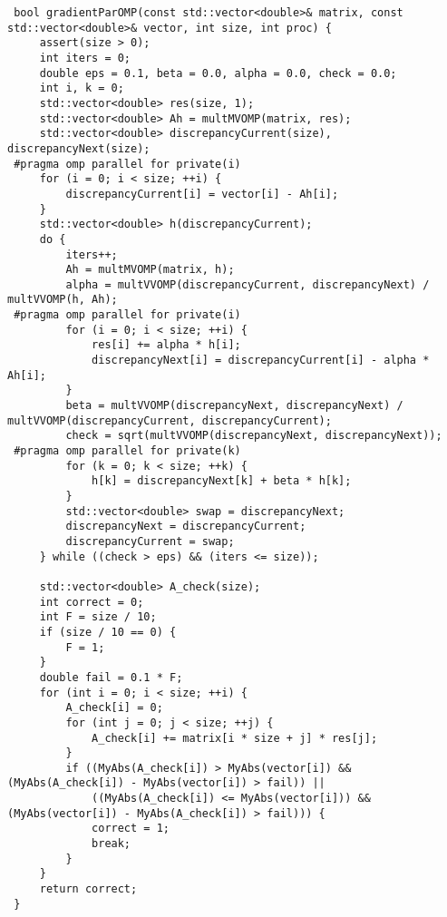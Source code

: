 \documentclass{report}
\begin{document}
\begin{lstlisting}
 bool gradientParOMP(const std::vector<double>& matrix, const std::vector<double>& vector, int size, int proc) {
     assert(size > 0);
     int iters = 0;
     double eps = 0.1, beta = 0.0, alpha = 0.0, check = 0.0;
     int i, k = 0;
     std::vector<double> res(size, 1);
     std::vector<double> Ah = multMVOMP(matrix, res);
     std::vector<double> discrepancyCurrent(size), discrepancyNext(size);
 #pragma omp parallel for private(i)
     for (i = 0; i < size; ++i) {
         discrepancyCurrent[i] = vector[i] - Ah[i];
     }
     std::vector<double> h(discrepancyCurrent);
     do {
         iters++;
         Ah = multMVOMP(matrix, h);
         alpha = multVVOMP(discrepancyCurrent, discrepancyNext) / multVVOMP(h, Ah);
 #pragma omp parallel for private(i)
         for (i = 0; i < size; ++i) {
             res[i] += alpha * h[i];
             discrepancyNext[i] = discrepancyCurrent[i] - alpha * Ah[i];
         }
         beta = multVVOMP(discrepancyNext, discrepancyNext) / multVVOMP(discrepancyCurrent, discrepancyCurrent);
         check = sqrt(multVVOMP(discrepancyNext, discrepancyNext));
 #pragma omp parallel for private(k)
         for (k = 0; k < size; ++k) {
             h[k] = discrepancyNext[k] + beta * h[k];
         }
         std::vector<double> swap = discrepancyNext;
         discrepancyNext = discrepancyCurrent;
         discrepancyCurrent = swap;
     } while ((check > eps) && (iters <= size));

     std::vector<double> A_check(size);
     int correct = 0;
     int F = size / 10;
     if (size / 10 == 0) {
         F = 1;
     }
     double fail = 0.1 * F;
     for (int i = 0; i < size; ++i) {
         A_check[i] = 0;
         for (int j = 0; j < size; ++j) {
             A_check[i] += matrix[i * size + j] * res[j];
         }
         if ((MyAbs(A_check[i]) > MyAbs(vector[i]) && (MyAbs(A_check[i]) - MyAbs(vector[i]) > fail)) ||
             ((MyAbs(A_check[i]) <= MyAbs(vector[i])) && (MyAbs(vector[i]) - MyAbs(A_check[i]) > fail))) {
             correct = 1;
             break;
         }
     }
     return correct;
 }

 \end{lstlisting}

 \begin{lstlisting}

 \end{lstlisting}

 
\end{document}
